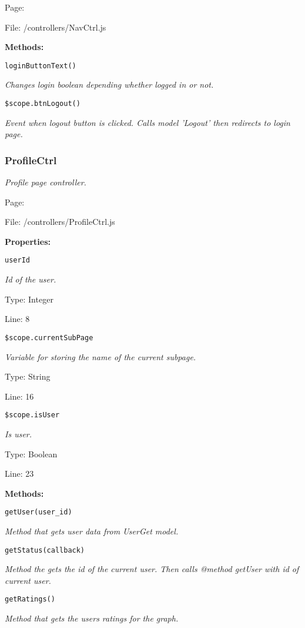 Page: \pageref{NavCtrl.js}

File: /controllers/NavCtrl.js

\textbf{Methods:}

\texttt{loginButtonText()}

{\scriptsize
\textit{Changes login boolean depending whether logged in or not.}

}

\texttt{\$scope.btnLogout()}

{\scriptsize
\textit{Event when logout button is clicked.
Calls model 'Logout' then redirects to login page.}

}

\subsubsection{ProfileCtrl}\label{ProfileCtrl.js.doc}
\textit{Profile page controller.}

Page: \pageref{ProfileCtrl.js}

File: /controllers/ProfileCtrl.js

\textbf{Properties:}

\texttt{userId}

{\scriptsize
\textit{Id of the user.}

Type: Integer

Line: 8

}
\texttt{\$scope.currentSubPage}

{\scriptsize
\textit{Variable for storing the name of the current subpage.}

Type: String

Line: 16

}
\texttt{\$scope.isUser}

{\scriptsize
\textit{Is user.}

Type: Boolean

Line: 23

}
\textbf{Methods:}

\texttt{getUser(user\_id)}

{\scriptsize
\textit{Method that gets user data from UserGet model.}

}

\texttt{getStatus(callback)}

{\scriptsize
\textit{Method the gets the id of the current user.
Then calls @method getUser with id of current user.}

}

\texttt{getRatings()}

{\scriptsize
\textit{Method that gets the users ratings for the graph.}

}

